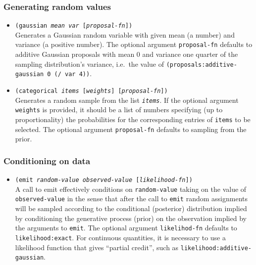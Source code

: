 \documentclass{article}
\begin{document}
\subsubsection{Generating random values}
\begin{itemize}
    \item[] \texttt{(gaussian \emph{mean} \emph{var} [\emph{proposal-fn}])}\\
        Generates a Gaussian random variable with given mean (a number) and
        variance (a positive number). The optional argument
        \texttt{proposal-fn} defaults to additive Gaussian proposals with mean
        0 and variance one quarter of the sampling distribution's variance,
          i.e.~the value of \texttt{(proposals:additive-gaussian 0 (/ var 4))}.
    \item[] \texttt{(categorical \emph{items} [\emph{weights}] [\emph{proposal-fn}])}\\
        Generates a random sample from the list \texttt{\emph{items}}. If the
        optional argument \texttt{weights} is provided, it should be a list of
        numbers specifying (up to proportionality) the probabilities for the
        corresponding entries of \texttt{items} to be selected. The optional
        argument \texttt{proposal-fn} defaults to sampling from the prior.
\end{itemize}

\subsubsection{Conditioning on data}
\begin{itemize}
    \item[] \texttt{(emit \emph{random-value} \emph{observed-value} [\emph{likelihood-fn}])}\\
        A call to emit effectively conditions on \texttt{random-value} taking
        on the value of \texttt{observed-value} in the sense that after the
        call to \texttt{emit} random assignments will be sampled according to
        the conditional (posterior) distribution implied by conditioning the
        generative process (prior) on the observation implied by the arguments
        to \texttt{emit}. The optional argument \texttt{likelihod-fn} defaults
        to \texttt{likelihood:exact}. For continuous quantities, it is
        necessary to use a likelihood function that gives ``partial credit'',
        such as \texttt{likelihood:additive-gaussian}.
\end{itemize}
\end{document}
